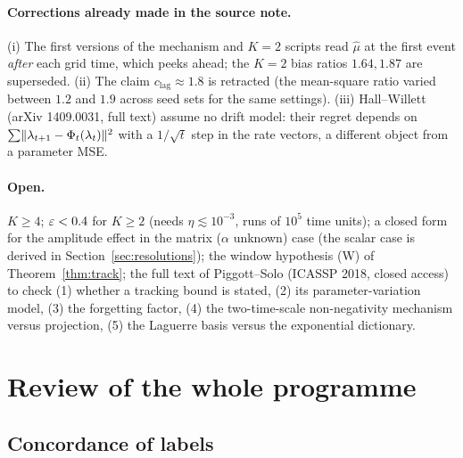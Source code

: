 \paragraph{Corrections already made in the source note.} (i) The first versions of the mechanism and $K=2$ scripts read $\hat\mu$ at the first event \emph{after} each grid time, which peeks ahead; the $K=2$ bias ratios $1.64,1.87$ are superseded. (ii) The claim $c_{\mathrm{lag}}\approx1.8$ is retracted (the mean-square ratio varied between $1.2$ and $1.9$ across seed sets for the same settings). (iii) Hall--Willett (arXiv 1409.0031, full text) assume no drift model: their regret depends on $\sum\lVert \lambda_{t+1}-\Phi_t(\lambda_t)\rVert^2$ with a $1/\sqrt t$ step in the rate vectors, a different object from a parameter MSE.

\paragraph{Open.} $K\ge4$; $\varepsilon<0.4$ for $K\ge2$ (needs $\eta\lesssim10^{-3}$, runs of $10^5$ time units); a closed form for the amplitude effect in the matrix ($\alpha$ unknown) case (the scalar case is derived in Section~\ref{sec:resolutions}); the window hypothesis (W) of Theorem~\ref{thm:track}; the full text of Piggott--Solo (ICASSP 2018, closed access) to check (1) whether a tracking bound is stated, (2) its parameter-variation model, (3) the forgetting factor, (4) the two-time-scale non-negativity mechanism versus projection, (5) the Laguerre basis versus the exponential dictionary.

\section{Review of the whole programme}\label{sec:review}

\subsection{Concordance of labels}

